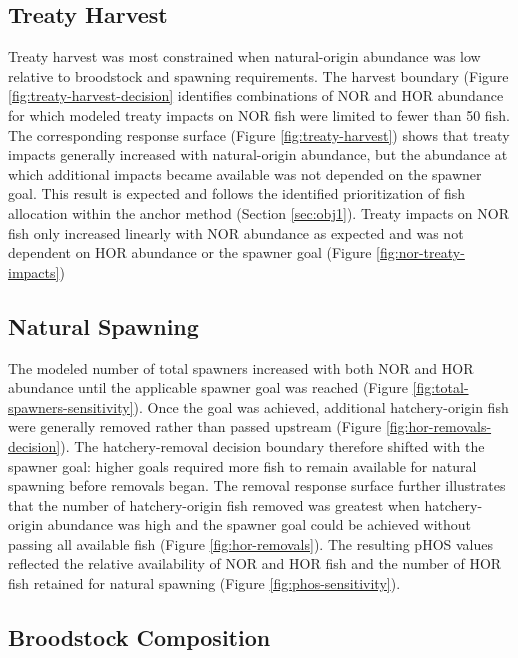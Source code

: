 \documentclass[12pt,letterpaper]{article}
\begin{document}
\subsection{Treaty Harvest}\label{treaty-harvest}

Treaty harvest was most constrained when natural-origin abundance was low relative to broodstock and spawning requirements. The harvest boundary (Figure \ref{fig:treaty-harvest-decision} identifies combinations of NOR and HOR abundance for which modeled treaty impacts on NOR fish were limited to fewer than 50 fish. The corresponding response surface (Figure \ref{fig:treaty-harvest}) shows that treaty impacts generally increased with natural-origin abundance, but the abundance at which additional impacts became available was not depended on the spawner goal. This result is expected and follows the identified prioritization of fish allocation within the anchor method (Section \ref{sec:obj1}). Treaty impacts on NOR fish only increased linearly with NOR abundance as expected and was not dependent on HOR abundance or the spawner goal (Figure \ref{fig:nor-treaty-impacts})

\subsection{Natural Spawning}\label{natural-spawning}

The modeled number of total spawners increased with both NOR and HOR abundance until the applicable spawner goal was reached (Figure \ref{fig:total-spawners-sensitivity}). Once the goal was achieved, additional hatchery-origin fish were generally removed rather than passed upstream (Figure \ref{fig:hor-removals-decision}). The hatchery-removal decision boundary therefore shifted with the spawner goal: higher goals required more fish to remain available for natural spawning before removals began. The removal response surface further illustrates that the number of hatchery-origin fish removed was greatest when hatchery-origin abundance was high and the spawner goal could be achieved without passing all available fish (Figure \ref{fig:hor-removals}). The resulting pHOS values reflected the relative availability of NOR and HOR fish and the number of HOR fish retained for natural spawning (Figure \ref{fig:phos-sensitivity}).

\subsection{Broodstock Composition}\label{broodstock-composition}
\end{document}
